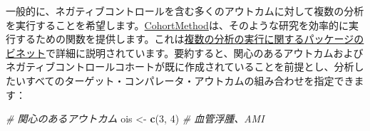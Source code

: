 \documentclass[
  11pt]{book}
\newenvironment{Shaded}{\begin{snugshade}}{\end{snugshade}}
\newcommand{\CommentTok}[1]{\textcolor[rgb]{0.56,0.35,0.01}{\textit{#1}}}
\newcommand{\DecValTok}[1]{\textcolor[rgb]{0.00,0.00,0.81}{#1}}
\newcommand{\FunctionTok}[1]{\textcolor[rgb]{0.13,0.29,0.53}{\textbf{#1}}}
\newcommand{\NormalTok}[1]{#1}
\newcommand{\OtherTok}[1]{\textcolor[rgb]{0.56,0.35,0.01}{#1}}
\theoremstyle{definition}
\theoremstyle{definition}
\theoremstyle{definition}
\theoremstyle{definition}
\theoremstyle{remark}
\begin{document}
一般的に、ネガティブコントロールを含む多くのアウトカムに対して複数の分析を実行することを希望します。\href{https://ohdsi.github.io/CohortMethod/}{CohortMethod}は、そのような研究を効率的に実行するための関数を提供します。これは\href{https://ohdsi.github.io/CohortMethod/articles/MultipleAnalyses.html}{複数の分析の実行に関するパッケージのビネット}で詳細に説明されています。要約すると、関心のあるアウトカムおよびネガティブコントロールコホートが既に作成されていることを前提とし、分析したいすべてのターゲット・コンパレータ・アウトカムの組み合わせを指定できます：

\begin{Shaded}
\begin{Highlighting}[]
\CommentTok{\# 関心のあるアウトカム}
\NormalTok{ois }\OtherTok{\textless{}{-}} \FunctionTok{c}\NormalTok{(}\DecValTok{3}\NormalTok{, }\DecValTok{4}\NormalTok{) }\CommentTok{\# 血管浮腫、AMI}


\end{Highlighting}
\end{Shaded}
\end{document}
